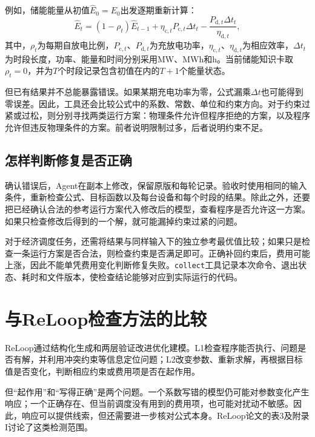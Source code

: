 \documentclass[chinese]{iarticle}
\begin{document}
例如，储能能量从初值$\widehat E_0=E_0$出发逐期重新计算：
\begin{equation}
  \widehat E_t=(1-\rho_t)\widehat E_{t-1}
  +\eta_{\mathrm c,t}P_{\mathrm c,t}\Delta t_t
  -\frac{P_{\mathrm d,t}\Delta t_t}{\eta_{\mathrm d,t}},
  \label{eq:storage}
\end{equation}
其中，$\rho_t$为每期自放电比例，$P_{\mathrm c,t}$、$P_{\mathrm d,t}$为充放电功率，$\eta_{\mathrm c,t}$、$\eta_{\mathrm d,t}$为相应效率，$\Delta t_t$为时段长度，功率、能量和时间分别采用MW、MWh和h。当前储能知识卡取$\rho_t=0$，并为$T$个时段记录包含初值在内的$T+1$个能量状态。

但已有结果并不总能暴露错误。如果某期充电功率为零，公式漏乘$\Delta t$也可能得到零误差。因此，工具还会比较公式中的系数、常数、单位和约束方向。对于约束过紧或过松，则分别寻找两类运行方案：物理条件允许但程序拒绝的方案，以及程序允许但违反物理条件的方案。前者说明限制过多，后者说明约束不足。

\subsection{怎样判断修复是否正确}

确认错误后，Agent在副本上修改，保留原版和每轮记录。验收时使用相同的输入条件，重新检查公式、目标函数以及每台设备和每个时段的结果。除此之外，还要把已经确认合法的参考运行方案代入修改后的模型，查看程序是否允许这一方案。如果只检查修改后得到的一个解，就可能漏掉约束过紧的问题\cite{semantic}。

对于经济调度任务，还需将结果与同样输入下的独立参考最优值比较；如果只是检查一条运行方案是否合法，则检查约束是否满足即可。正确补回约束后，费用可能上涨，因此不能单凭费用变化判断修复失败。\texttt{collect}工具记录本次命令、退出状态、耗时和文件版本，使检查结论能够对应到实际运行的代码\cite{onboarding}。

\section{与ReLoop检查方法的比较}

ReLoop通过结构化生成和两层验证改进优化建模。L1检查程序能否执行、问题是否有解，并利用冲突约束等信息定位问题；L2改变参数、重新求解，再根据目标值是否变化，判断相应约束或费用项是否在起作用\cite{reloop}。

但“起作用”和“写得正确”是两个问题。一个系数写错的模型仍可能对参数变化产生响应；一个正确存在、但当前调度没有用到的费用项，也可能对扰动不敏感。因此，响应可以提供线索，但还需要进一步核对公式本身。ReLoop论文的表3及附录I讨论了这类检测范围\cite{reloop}。
\end{document}
